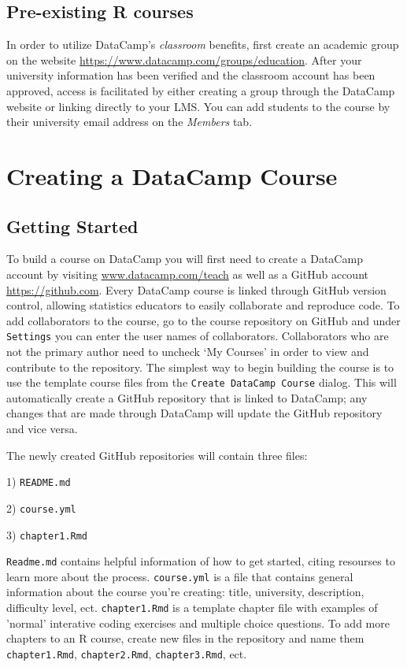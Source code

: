 \documentclass[12pt]{article}\usepackage[]{graphicx}\usepackage[]{color}
\begin{document}
\subsection{Pre-existing R courses}
In order to utilize 
DataCamp's \textit{classroom} benefits, first create an academic group on the website \url{https://www.datacamp.com/groups/education}.
After your university information has been verified and the classroom account has been approved, access is facilitated 
by either creating a group through the DataCamp website or linking directly to your LMS. You can add students to the course by their university email address on the \textit{Members} tab.
\section{Creating a DataCamp Course}
\subsection{Getting Started}
To build a course on DataCamp you will first need to create a DataCamp account by visiting \url{www.datacamp.com/teach} as well as
a GitHub account \url{https://github.com}. Every DataCamp course is linked through GitHub version control,
allowing statistics educators to easily collaborate and reproduce code. To add collaborators to the course, go to the course repository
on GitHub and under \texttt{Settings} you can enter the user names of collaborators. Collaborators who are not the primary author need 
to uncheck `My Courses' in order to view and contribute to the repository. The simplest way to begin building the course is to use the template course files from the
\texttt{Create DataCamp Course} dialog. This will automatically create a GitHub repository that is linked to DataCamp; any changes that are
made through DataCamp will update the GitHub repository and vice versa. 

The newly created GitHub repositories will contain three files: 

1) \texttt{README.md}

2) \texttt{course.yml}

3) \texttt{chapter1.Rmd}

\texttt{Readme.md} contains helpful information of how to get started, citing resourses to learn more about the process.
\texttt{course.yml} is a file that contains general information about the course you're creating: title, university, description,
difficulty level, ect.
\texttt{chapter1.Rmd} is a template chapter file with examples of 'normal' interative coding exercises and multiple choice questions.
To add more chapters to an R course, create new files in the repository and name them \texttt{chapter1.Rmd}, \texttt{chapter2.Rmd},
\texttt{chapter3.Rmd}, ect.
\end{document}
